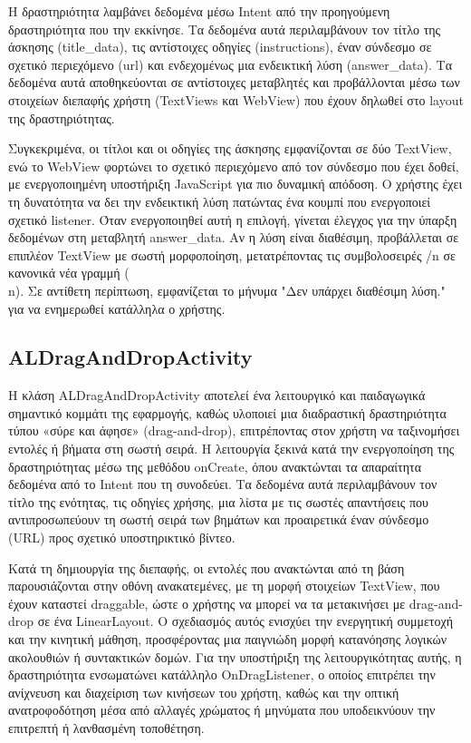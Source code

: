 \documentclass[11pt]{report}
\begin{document}
Η δραστηριότητα λαμβάνει δεδομένα μέσω Intent από την προηγούμενη δραστηριότητα που την εκκίνησε. Τα δεδομένα αυτά περιλαμβάνουν τον τίτλο της άσκησης (title\_data), τις αντίστοιχες οδηγίες (instructions), έναν σύνδεσμο σε σχετικό περιεχόμενο (url) και ενδεχομένως μια ενδεικτική λύση (answer\_data). Τα δεδομένα αυτά αποθηκεύονται σε αντίστοιχες μεταβλητές και προβάλλονται μέσω των στοιχείων διεπαφής χρήστη (TextViews και WebView) που έχουν δηλωθεί στο layout της δραστηριότητας. 

Συγκεκριμένα, οι τίτλοι και οι οδηγίες της άσκησης εμφανίζονται σε δύο TextView, ενώ το WebView φορτώνει το σχετικό περιεχόμενο από τον σύνδεσμο που έχει δοθεί, με ενεργοποιημένη υποστήριξη JavaScript για πιο δυναμική απόδοση. Ο χρήστης έχει τη δυνατότητα να δει την ενδεικτική λύση πατώντας ένα κουμπί που ενεργοποιεί σχετικό listener. Όταν ενεργοποιηθεί αυτή η επιλογή, γίνεται έλεγχος για την ύπαρξη δεδομένων στη μεταβλητή answer\_data. Αν η λύση είναι διαθέσιμη, προβάλλεται σε επιπλέον TextView με σωστή μορφοποίηση, μετατρέποντας τις συμβολοσειρές /n σε κανονικά νέα γραμμή (\\n). Σε αντίθετη περίπτωση, εμφανίζεται το μήνυμα "Δεν υπάρχει διαθέσιμη λύση." για να ενημερωθεί κατάλληλα ο χρήστης. 

\subsection{ALDragAndDropActivity}

Η κλάση ALDragAndDropActivity αποτελεί ένα λειτουργικό και παιδαγωγικά σημαντικό κομμάτι της εφαρμογής, καθώς υλοποιεί μια διαδραστική δραστηριότητα τύπου «σύρε και άφησε» (drag-and-drop), επιτρέποντας στον χρήστη να ταξινομήσει εντολές ή βήματα στη σωστή σειρά. Η λειτουργία ξεκινά κατά την ενεργοποίηση της δραστηριότητας μέσω της μεθόδου onCreate, όπου ανακτώνται τα απαραίτητα δεδομένα από το Intent που τη συνοδεύει. Τα δεδομένα αυτά περιλαμβάνουν τον τίτλο της ενότητας, τις οδηγίες χρήσης, μια λίστα με τις σωστές απαντήσεις που αντιπροσωπεύουν τη σωστή σειρά των βημάτων και προαιρετικά έναν σύνδεσμο (URL) προς σχετικό υποστηρικτικό βίντεο. 

Κατά τη δημιουργία της διεπαφής, οι εντολές που ανακτώνται από τη βάση παρουσιάζονται στην οθόνη ανακατεμένες, με τη μορφή στοιχείων TextView, που έχουν καταστεί draggable, ώστε ο χρήστης να μπορεί να τα μετακινήσει με drag-and-drop σε ένα LinearLayout. Ο σχεδιασμός αυτός ενισχύει την ενεργητική συμμετοχή και την κινητική μάθηση, προσφέροντας μια παιγνιώδη μορφή κατανόησης λογικών ακολουθιών ή συντακτικών δομών. Για την υποστήριξη της λειτουργικότητας αυτής, η δραστηριότητα ενσωματώνει κατάλληλο OnDragListener, ο οποίος επιτρέπει την ανίχνευση και διαχείριση των κινήσεων του χρήστη, καθώς και την οπτική ανατροφοδότηση μέσα από αλλαγές χρώματος ή μηνύματα που υποδεικνύουν την επιτρεπτή ή λανθασμένη τοποθέτηση. 
\end{document}
